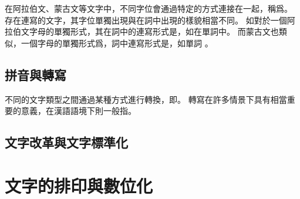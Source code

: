 在阿拉伯文、蒙古文等文字中，不同字位會通過特定的方式連接在一起，稱爲。
存在連寫的文字，其字位單獨出現與在詞中出現的樣貌相當不同。
如對於一個阿拉伯文字母的單獨形式，其在詞中的連寫形式是，如在單詞中。
而蒙古文也類似，一個字母的單獨形式爲，詞中連寫形式是，如單詞 。

\subsection{拼音與轉寫}
不同的文字類型之間通過某種方式進行轉換，即。
轉寫在許多情景下具有相當重要的意義，在漢語語境下則一般指。

\subsection{文字改革與文字標準化}


\section{文字的排印與數位化}
